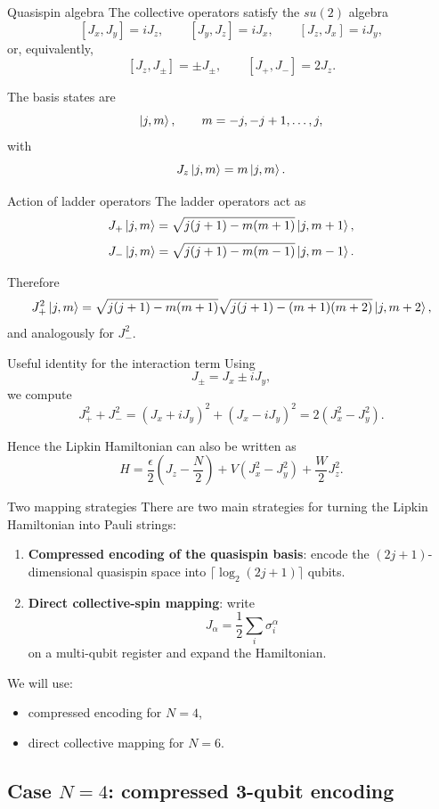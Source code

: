 \documentclass[aspectratio=169]{beamer}
\begin{document}
\begin{frame}{Quasispin algebra}
The collective operators satisfy the \(su(2)\) algebra
\[
[J_x,J_y]=iJ_z,\qquad
[J_y,J_z]=iJ_x,\qquad
[J_z,J_x]=iJ_y,
\]
or, equivalently,
\[
[J_z,J_\pm]=\pm J_\pm,
\qquad
[J_+,J_-]=2J_z.
\]

The basis states are
\[
\ket{j,m},
\qquad
m=-j,-j+1,\dots,j,
\]
with
\[
J_z\ket{j,m}=m\ket{j,m}.
\]
\end{frame}

\begin{frame}{Action of ladder operators}
The ladder operators act as
\[
J_+\ket{j,m}
=
\sqrt{j(j+1)-m(m+1)}\ket{j,m+1},
\]
\[
J_-\ket{j,m}
=
\sqrt{j(j+1)-m(m-1)}\ket{j,m-1}.
\]

Therefore
\[
J_+^2\ket{j,m}
=
\sqrt{j(j+1)-m(m+1)}
\sqrt{j(j+1)-(m+1)(m+2)}
\ket{j,m+2},
\]
and analogously for \(J_-^2\).
\end{frame}

\begin{frame}{Useful identity for the interaction term}
Using
\[
J_\pm = J_x \pm iJ_y,
\]
we compute
\[
J_+^2 + J_-^2
=
(J_x+iJ_y)^2 + (J_x-iJ_y)^2
=
2(J_x^2-J_y^2).
\]

Hence the Lipkin Hamiltonian can also be written as
\[
H
=
\frac{\epsilon}{2}\left(J_z-\frac{N}{2}\right)
+
V(J_x^2-J_y^2)
+
\frac{W}{2}J_z^2.
\]
\end{frame}

\begin{frame}{Two mapping strategies}
There are two main strategies for turning the Lipkin Hamiltonian into Pauli strings:
\begin{enumerate}
\item \textbf{Compressed encoding of the quasispin basis}: encode the \((2j+1)\)-dimensional quasispin space into \(\lceil \log_2(2j+1)\rceil\) qubits.
\item \textbf{Direct collective-spin mapping}: write
\[
J_\alpha = \frac12\sum_i \sigma_i^\alpha
\]
on a multi-qubit register and expand the Hamiltonian.
\end{enumerate}

We will use:
\begin{itemize}
\item compressed encoding for \(N=4\),
\item direct collective mapping for \(N=6\).
\end{itemize}
\end{frame}

\subsection{Case \(N=4\): compressed 3-qubit encoding}
\end{document}

